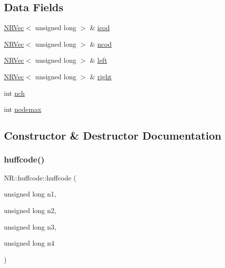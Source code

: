 \subsection*{Data Fields}
\begin{DoxyCompactItemize}
\item 
\mbox{\hyperlink{classNR_1_1NRVec}{N\+R\+Vec}}$<$ unsigned long $>$ \& \mbox{\hyperlink{classNR_1_1huffcode_ad0de07752f40849b79f1e8ba6a23599d}{icod}}
\item 
\mbox{\hyperlink{classNR_1_1NRVec}{N\+R\+Vec}}$<$ unsigned long $>$ \& \mbox{\hyperlink{classNR_1_1huffcode_ab14fb00caae8be1a44a6d6605f18a02d}{ncod}}
\item 
\mbox{\hyperlink{classNR_1_1NRVec}{N\+R\+Vec}}$<$ unsigned long $>$ \& \mbox{\hyperlink{classNR_1_1huffcode_ad2aaf6e4e3d2b91875ced865d3c1662e}{left}}
\item 
\mbox{\hyperlink{classNR_1_1NRVec}{N\+R\+Vec}}$<$ unsigned long $>$ \& \mbox{\hyperlink{classNR_1_1huffcode_ac4dba36044a7dc9a52678f850fbc2a8c}{right}}
\item 
int \mbox{\hyperlink{classNR_1_1huffcode_a9083384cfcc723a3ab528d4530378d56}{nch}}
\item 
int \mbox{\hyperlink{classNR_1_1huffcode_aef596001bc067014b5c9dc4273f33252}{nodemax}}
\end{DoxyCompactItemize}


\subsection{Constructor \& Destructor Documentation}
\mbox{\label{classNR_1_1huffcode_adf21f7c173d14b46a90ca8295cfc61fd}} 
\subsubsection{\texorpdfstring{huffcode()}{huffcode()}\hspace{0.1cm}{\footnotesize\ttfamily [1/3]}}
{\footnotesize\ttfamily N\+R\+::huffcode\+::huffcode (\begin{DoxyParamCaption}\item[{unsigned long}]{n1,  }\item[{unsigned long}]{n2,  }\item[{unsigned long}]{n3,  }\item[{unsigned long}]{n4 }\end{DoxyParamCaption})\hspace{0.3cm}{\ttfamily [inline]}}

